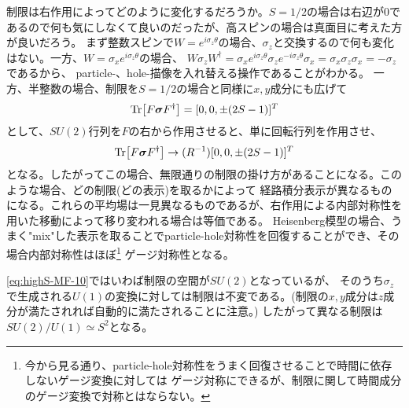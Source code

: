 \documentclass[11pt, aps, longbibliography]{article}
\begin{document}
        制限は右作用によってどのように変化するだろうか。$S=1/2$の場合は右辺が0であるので何も気にしなくて良いのだったが、高スピンの場合は真面目に考えた方が良いだろう。
        まず整数スピンで$W=e^{i\sigma_z \theta}$の場合、$\sigma_z$と交換するので何も変化はない。一方、$W=\sigma_xe^{i\sigma_z \theta}$の場合、
        $W\sigma_zW^\dagger = \sigma_xe^{i\sigma_z \theta} \sigma_z e^{-i\sigma_z \theta} \sigma_x =  \sigma_x \sigma_z \sigma_x =-\sigma_z$であるから、
        particle-、hole-描像を入れ替える操作であることがわかる。
        一方、半整数の場合、制限を$S=1/2$の場合と同様に$x,y$成分にも広げて
        \begin{equation}\label{eq:highS-MF-9}
            \Tr[F \boldsymbol{\sigma} F^\dagger] = [0, 0, \pm(2S-1)]^T
        \end{equation}
        として、$SU(2)$行列を$F$の右から作用させると、単に回転行列を作用させ、
        \begin{equation}\label{eq:highS-MF-10}
            \Tr[F \boldsymbol{\sigma} F^\dagger] \rightarrow (R^{-1})[0, 0, \pm(2S-1)]^T
        \end{equation}
        となる。したがってこの場合、無限通りの制限の掛け方があることになる。このような場合、どの制限(どの表示)を取るかによって
        経路積分表示が異なるものになる。これらの平均場は一見異なるものであるが、右作用による内部対称性を用いた移動によって移り変われる場合は等価である。
        Heisenberg模型の場合、うまく"mix"した表示を取ることでparticle-hole対称性を回復することができ、その場合内部対称性はほぼ\footnote{今から見る通り、particle-hole対称性をうまく回復させることで時間に依存しないゲージ変換に対しては
        ゲージ対称にできるが、制限に関して時間成分のゲージ変換で対称とはならない。}
        ゲージ対称性となる。

        \eqref{eq:highS-MF-10}ではいわば制限の空間が$SU(2)$となっているが、
        そのうち$\sigma_z$で生成される$U(1)$の変換に対しては制限は不変である。(制限の$x,y$成分は$z$成分が満たされれば自動的に満たされることに注意。)
        したがって異なる制限は$SU(2)/U(1) \simeq S^2$となる。
\end{document}
